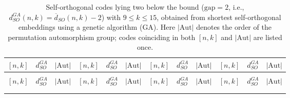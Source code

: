 \documentclass{article}
\begin{document}
\begin{longtable}{c|c|c||c|c|c||c|c|c||c|c|c}
\caption{Self-orthogonal codes lying two below the bound
($\mathrm{gap}=2$, i.e.,
$d_{SO}^{GA}(n,k)=\overline{d}_{SO}(n,k)-2$) with
$9\leq k\leq 15$, obtained from shortest self-orthogonal embeddings
using a genetic algorithm (GA). Here $|\mathrm{Aut}|$ denotes the
order of the permutation automorphism group; codes coinciding in
both $[n,k]$ and $|\mathrm{Aut}|$ are listed once.}
\label{tab:so_embedding_gap2}\\

\hline
$[n,k]$ & $d_{SO}^{GA}$ & $|\mathrm{Aut}|$
& $[n,k]$ & $d_{SO}^{GA}$ & $|\mathrm{Aut}|$
& $[n,k]$ & $d_{SO}^{GA}$ & $|\mathrm{Aut}|$
& $[n,k]$ & $d_{SO}^{GA}$ & $|\mathrm{Aut}|$ \\
\hline
\endfirsthead

\multicolumn{12}{c}{}\\
\hline
$[n,k]$ & $d_{SO}^{GA}$ & $|\mathrm{Aut}|$
& $[n,k]$ & $d_{SO}^{GA}$ & $|\mathrm{Aut}|$
& $[n,k]$ & $d_{SO}^{GA}$ & $|\mathrm{Aut}|$
& $[n,k]$ & $d_{SO}^{GA}$ & $|\mathrm{Aut}|$ \\
\hline
\endhead

\multicolumn{12}{r}{}\\
\endfoot

\endlastfoot


\end{longtable}
\end{document}
